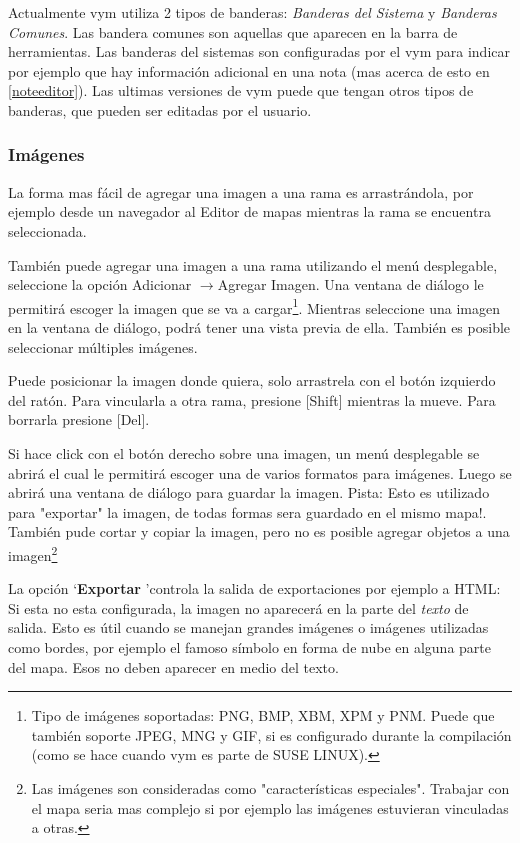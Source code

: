\documentclass{article}
\newcommand{\vym}{{\sc vym }}
\newcommand{\ra}{$\longrightarrow$}
\newcommand{\key}[1]{[#1]}
\begin{document}
Actualmente \vym utiliza 2 tipos de banderas: {\em Banderas del Sistema} y {\em Banderas Comunes}. Las bandera comunes son aquellas que aparecen en la barra de herramientas. Las banderas del sistemas son configuradas por el \vym para indicar por ejemplo que hay informaci\'on adicional en una nota (mas acerca de esto en \ref{noteeditor}). Las ultimas versiones de \vym puede que tengan otros tipos de banderas, que pueden ser editadas por el usuario.


\subsubsection*{Im\'agenes}
La forma mas f\'acil de agregar una imagen a una rama es arrastr\'andola, por ejemplo desde un navegador al Editor de mapas mientras la rama se encuentra seleccionada.

Tambi\'en puede agregar una imagen a una rama utilizando el men\'u desplegable, seleccione la opci\'on Adicionar \ra Agregar Imagen. Una ventana de di\'alogo le permitir\'a escoger la imagen que se va a cargar\footnote{Tipo de im\'agenes soportadas: PNG, BMP, XBM, XPM y PNM. Puede que tambi\'en soporte JPEG, MNG y GIF, si es configurado durante la compilaci\'on (como se hace cuando \vym es parte de SUSE LINUX).}.
Mientras seleccione una imagen en la ventana de di\'alogo, podr\'a tener una vista previa de ella. Tambi\'en es posible seleccionar m\'ultiples im\'agenes.

Puede posicionar la imagen donde quiera, solo arrastrela con el bot\'on izquierdo del rat\'on. Para vincularla a otra rama, presione \key{Shift} mientras la mueve. Para borrarla presione \key{Del}.   

Si hace click con el bot\'on derecho sobre una imagen, un men\'u desplegable se abrir\'a el cual le permitir\'a escoger una de varios formatos para im\'agenes. Luego se abrir\'a una ventana de di\'alogo para guardar la imagen. Pista: Esto es utilizado para "exportar" la imagen, de todas formas sera guardado en el mismo mapa!. Tambi\'en pude cortar y copiar la imagen, pero no es posible agregar objetos a una imagen\footnote{
    Las im\'agenes son consideradas como "caracter\'isticas especiales". Trabajar con el mapa seria mas complejo si por ejemplo las im\'agenes estuvieran vinculadas a otras.}
    
La opci\'on \lq{\bf Exportar} \rq controla la salida de exportaciones por ejemplo a HTML: Si esta no esta configurada, la imagen no aparecer\'a en la parte del {\em texto} de salida. Esto es \'util cuando se manejan grandes im\'agenes o im\'agenes utilizadas como bordes, por ejemplo el famoso s\'imbolo en forma de nube en alguna parte del mapa. Esos no deben aparecer en medio del texto.
\end{document}
